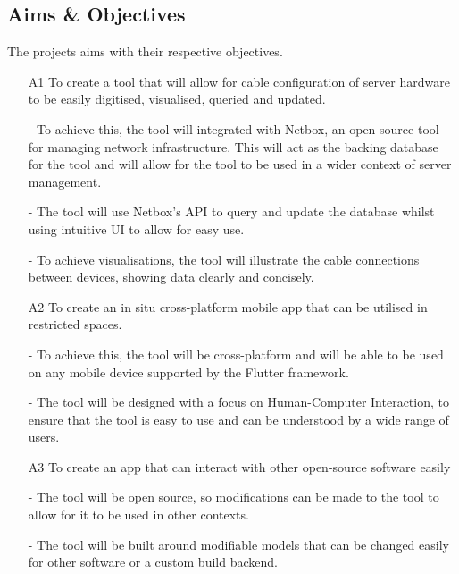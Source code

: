 \documentclass [11pt,a4paper]{article}
\begin{document}
\subsection{Aims \& Objectives}
\label{sec:objectives}
The projects aims with their respective objectives.
\begin{enumerate} 
    
    \item[A1] To create a tool that will allow for cable configuration of server hardware to be
    easily digitised, visualised, queried and updated. 
        
    - To achieve this, the tool will integrated with Netbox, an open-source tool for managing network infrastructure. This will act as the backing database for the tool and will allow for the tool to be used in a wider context of server management.

        - The tool will use Netbox's API to query and update the database whilst using intuitive UI to allow for easy use.
        
        - To achieve visualisations, the tool will illustrate the cable connections between devices, showing data clearly and concisely.

    \item[A2] To create an in situ cross-platform mobile app that can be utilised in restricted
    spaces.    

    - To achieve this, the tool will be cross-platform and will be able to be used on any mobile device supported by the Flutter framework.
    
    - The tool will be designed with a focus on Human-Computer Interaction, to ensure that the tool is easy to use and can be understood by a wide range of users.

    \item[A3] To create an app that can interact with other open-source software easily
    
        - The tool will be open source, so modifications can be made to the tool to allow for it to be used in other contexts.
        
        - The tool will be built around modifiable models that can be changed easily for other software or a custom build backend.

\end{enumerate}
\end{document}
